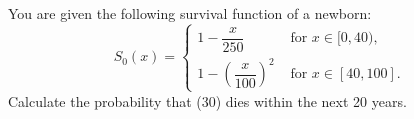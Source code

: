 You are given the following survival function of a newborn:
\[
  S_0(x) = \left\{\begin{array}{cc} 1-        \dfrac{x}{250}                & \mbox{ for } x\in[0,40), \\
                                                         1-\left(\dfrac{x}{100}\right)^2 & \mbox{ for } x\in[40,100].
 \end{array}\right.
\]
  Calculate the probability that (30) dies within the next 20 years.

